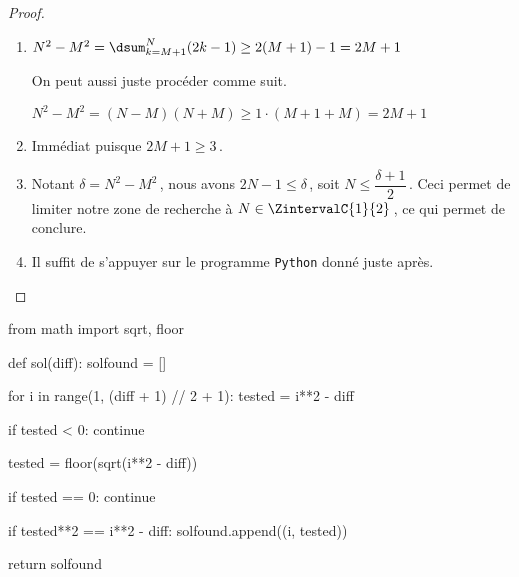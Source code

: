 \begin{proof}
	\leavevmode
	
	\vspace{-1ex}
	\begin{enumerate}
		\item $N^2 - M^2 = \dsum_{k=M+1}^{N} (2 k - 1) \geq 2(M + 1) - 1 = 2M + 1$
		
		\smallskip
		\noindent
		On peut aussi juste procéder comme suit. 
		
		\smallskip
		\noindent
		$N^2 - M^2 = (N - M)(N + M) \geq 1 \cdot (M + 1 + M) = 2M + 1$


		\item Immédiat puisque $2M + 1 \geq 3$\,.


		\item Notant $\delta = N^2 - M^2$\,, nous avons $2 N - 1 \leq \delta$\,, soit $N  \leq \dfrac{\delta + 1}{2}$\,.
		Ceci permet de limiter notre zone de recherche à $N \in \ZintervalC{1}{2}$\,, ce qui permet de conclure.
		

		\item Il suffit de s'appuyer sur le programme \verb#Python# donné juste après.
		\qedhere
	\end{enumerate}
\end{proof}


\begin{Python}
from math import sqrt, floor

def sol(diff):
    solfound = []

    for i in range(1, (diff + 1) // 2 + 1):
        tested = i**2 - diff

        if tested < 0:
            continue

        tested = floor(sqrt(i**2 - diff))

        if tested == 0:
            continue

        if tested**2 == i**2 - diff:
            solfound.append((i, tested))

    return solfound
\end{Python}

